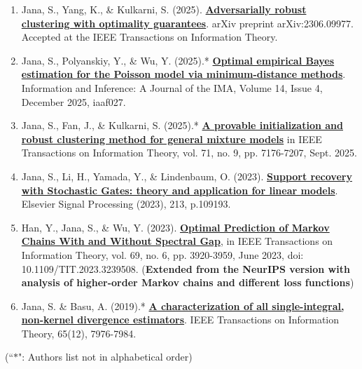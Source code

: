 \documentclass[letterpaper,12pt,oneside]{article}
\theoremstyle{definition}
\begin{document}
			\begin{enumerate}
				
				\item Jana, S., Yang, K., \& Kulkarni, S. (2025). \href{https://arxiv.org/abs/2306.09977}{\bf Adversarially robust clustering with optimality guarantees}. arXiv preprint arXiv:2306.09977. Accepted at the IEEE Transactions on Information Theory.
				
				
				\item Jana, S., Polyanskiy, Y., \& Wu, Y. (2025).* {\bf \href{https://doi.org/10.1093/imaiai/iaaf027}{Optimal empirical Bayes estimation for the Poisson model via minimum-distance methods}}. Information and Inference: A Journal of the IMA, Volume 14, Issue 4, December 2025, iaaf027.
				
				\item Jana, S., Fan, J., \& Kulkarni, S. (2025).* {\bf \href{https://ieeexplore.ieee.org/document/11069307}{A provable initialization and robust clustering method for general mixture models}} in IEEE Transactions on Information Theory, vol. 71, no. 9, pp. 7176-7207, Sept. 2025.
				
				
				\item Jana, S., Li, H., Yamada, Y., \& Lindenbaum, O. (2023). {\bf \href{https://www.sciencedirect.com/science/article/abs/pii/S0165168423002670}{\bf Support recovery with Stochastic Gates: theory and application for linear models}}. Elsevier Signal Processing (2023), 213, p.109193.
				
				\item Han, Y., Jana, S., \& Wu, Y. (2023). \href{https://ieeexplore.ieee.org/abstract/document/10028667}{\bf Optimal Prediction of Markov Chains With and Without Spectral Gap}, in IEEE Transactions on Information Theory, vol. 69, no. 6, pp. 3920-3959, June 2023, doi: 10.1109/TIT.2023.3239508. (\textbf{Extended from the NeurIPS version with analysis of higher-order Markov chains and different loss functions})
				
				\item Jana, S. \& Basu, A. (2019).* \href{https://janasoham.github.io/files/bregman_charac.pdf}{\bf A characterization of all single-integral, non-kernel divergence estimators}. IEEE Transactions on Information Theory, 65(12), 7976-7984.
				
			\end{enumerate}
			
			 (``$\ast$": Authors list not in alphabetical order)
			
\end{document}
